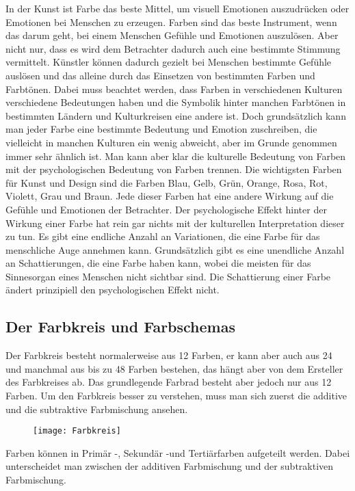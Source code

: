 In der Kunst ist Farbe das beste Mittel, um visuell Emotionen auszudrücken oder Emotionen bei Menschen zu erzeugen. Farben sind das beste Instrument, wenn das darum geht, bei einem Menschen Gefühle und Emotionen auszulösen. Aber nicht nur, dass es wird dem Betrachter dadurch auch eine bestimmte Stimmung vermittelt. Künstler können dadurch gezielt bei Menschen bestimmte Gefühle auslösen und das alleine durch das Einsetzen von bestimmten Farben und Farbtönen.
Dabei muss beachtet werden, dass Farben in verschiedenen Kulturen verschiedene Bedeutungen haben und die Symbolik hinter manchen Farbtönen in bestimmten Ländern und Kulturkreisen eine andere ist. Doch grundsätzlich kann man jeder Farbe eine bestimmte Bedeutung und Emotion zuschreiben, die vielleicht in manchen Kulturen ein wenig abweicht, aber im Grunde genommen immer sehr ähnlich ist.
Man kann aber klar die kulturelle Bedeutung von Farben mit der psychologischen Bedeutung von Farben trennen. Die wichtigsten Farben für Kunst und Design sind die Farben Blau, Gelb, Grün, Orange, Rosa, Rot, Violett, Grau und Braun. Jede dieser Farben hat eine andere Wirkung auf die Gefühle und Emotionen der Betrachter. Der psychologische Effekt hinter der Wirkung einer Farbe hat rein gar nichts mit der kulturellen Interpretation dieser zu tun. 
Es gibt eine endliche Anzahl an Variationen, die eine Farbe für das menschliche Auge annehmen kann. Grundsätzlich gibt es eine unendliche Anzahl an Schattierungen, die eine Farbe haben kann, wobei die meisten für das Sinnesorgan eines Menschen nicht sichtbar sind. Die Schattierung einer Farbe ändert prinzipiell den psychologischen Effekt nicht.


\subsection{Der Farbkreis und Farbschemas}
Der Farbkreis besteht normalerweise aus 12 Farben, er kann aber auch aus 24 und manchmal aus bis zu 48 Farben bestehen, das hängt aber von dem Ersteller des Farbkreises ab. Das grundlegende Farbrad besteht aber jedoch nur aus 12 Farben. Um den Farbkreis besser zu verstehen, muss man sich zuerst die additive und die subtraktive Farbmischung ansehen.  

\begin{figure}[h]
	\centering
	\texttt{[image: Farbkreis]}
	\caption{\cite{_basicColorTheory}}
\end{figure}

Farben können in Primär -, Sekundär -und Tertiärfarben aufgeteilt werden. Dabei unterscheidet man zwischen der additiven Farbmischung und der subtraktiven Farbmischung. 

